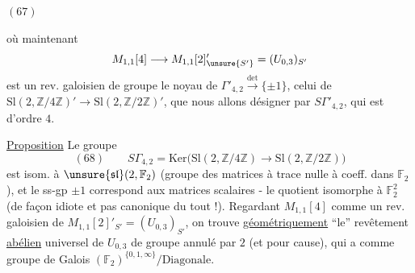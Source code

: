
\((67)\)

où maintenant
\[
M_{1,1}[4]\longrightarrow M_{1,1}[2]'_{\unsure{S'}}
=(U_{0,3})_{S'}
\]
est un rev. galoisien de groupe le noyau de
$\Gamma'_{4,2}\xrightarrow{\det}\{\pm1\}$,
 celui de
$\mathrm{Sl}(2,\mathbb Z/4\mathbb Z)'
\longrightarrow\mathrm{Sl}(2,\mathbb Z/2\mathbb Z)'$,
que nous allons désigner par $S\Gamma'_{4,2}$, qui est d'ordre $4$.

\uline{Proposition} Le groupe
\[
(68)\qquad
S\Gamma_{4,2}
=
\mathrm{Ker}\bigl(
\mathrm{Sl}(2,\mathbb Z/4\mathbb Z)
\longrightarrow
\mathrm{Sl}(2,\mathbb Z/2\mathbb Z)
\bigr)
\]
est isom. à 
$\unsure{\mathfrak{sl}}(2,\mathbb F_2)$
(groupe des matrices à trace nulle à coeff. dans $\mathbb F_2$),
et le ss-gp $\pm1$ correspond aux matrices scalaires -
le quotient 
isomorphe à  $\mathbb F_2^2$
(de façon idiote et pas canonique du tout !).
Regardant $M_{1,1}[4]$ comme un rev. galoisien de
$M_{1,1}[2]'_{S'}=(U_{0,3})_{S'}$, on trouve
\uline{géométriquement} ``le'' revêtement \uline{abélien} universel de
$U_{0,3}$ de groupe annulé par $2$ (et pour cause), qui a comme groupe
de Galois $(\mathbb F_2)^{\{0,1,\infty\}}/\mathrm{Diagonale}$.

